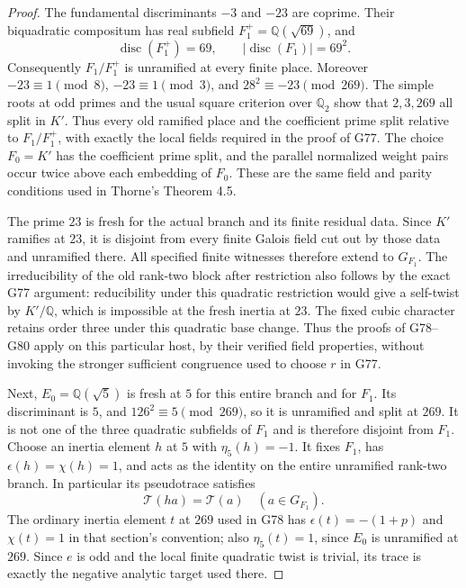 \begin{proof}
The fundamental discriminants $-3$ and $-23$ are coprime.
Their biquadratic compositum has real subfield
$F_1^+=\mathbb Q(\sqrt{69})$, and
\[
          \operatorname{disc}(F_1^+)=69,\qquad
          |\operatorname{disc}(F_1)|=69^2.             \tag{G103C.7}
\]
Consequently $F_1/F_1^+$ is unramified at every finite place.
Moreover $-23\equiv1\pmod8$, $-23\equiv1\pmod3$, and
$28^2\equiv-23\pmod{269}$.  The simple roots at odd primes
and the usual square criterion over $\mathbb Q_2$ show that
$2,3,269$ all split in $K'$.
Thus every old ramified place and the coefficient prime split
relative to $F_1/F_1^+$, with exactly the local fields required in
the proof of G77.  The choice $F_0=K'$ has the coefficient prime
split, and the parallel normalized weight pairs occur twice above
each embedding of $F_0$.  These are the same field and parity
conditions used in Thorne's Theorem 4.5.

The prime $23$ is fresh for the actual branch and its finite residual
data.  Since $K'$ ramifies at $23$, it is disjoint from every finite
Galois field cut out by those data and unramified there.
All specified finite witnesses therefore extend to $G_{F_1}$.
The irreducibility of the old rank-two block after restriction also
follows by the exact G77 argument: reducibility under this quadratic
restriction would give a self-twist by $K'/\mathbb Q$, which is
impossible at the fresh inertia at $23$.
The fixed cubic character retains order three under this quadratic
base change.  Thus the proofs of G78--G80 apply on this particular
host, by their verified field properties, without invoking the
stronger sufficient congruence used to choose $r$ in G77.

Next, $E_0=\mathbb Q(\sqrt5)$ is fresh at $5$ for this entire branch
and for $F_1$.  Its discriminant is $5$, and
$126^2\equiv5\pmod{269}$, so it is unramified and split at $269$.
It is not one of the three quadratic subfields of $F_1$ and is
therefore disjoint from $F_1$.
Choose an inertia element $h$ at $5$ with $\eta_5(h)=-1$.
It fixes $F_1$, has $\epsilon(h)=\chi(h)=1$, and acts as the
identity on the entire unramified rank-two branch.
In particular its pseudotrace satisfies
\[
                     \mathcal T(ha)=\mathcal T(a)
                        \quad(a\in G_{F_1}).         \tag{G103C.8}
\]
The ordinary inertia element $t$ at $269$ used in G78 has
$\epsilon(t)=-(1+p)$ and $\chi(t)=1$ in that section's convention;
also $\eta_5(t)=1$, since $E_0$ is unramified at $269$.
Since $e$ is odd and the local finite quadratic twist is trivial,
its trace is exactly the negative analytic target used there.


\end{proof}
